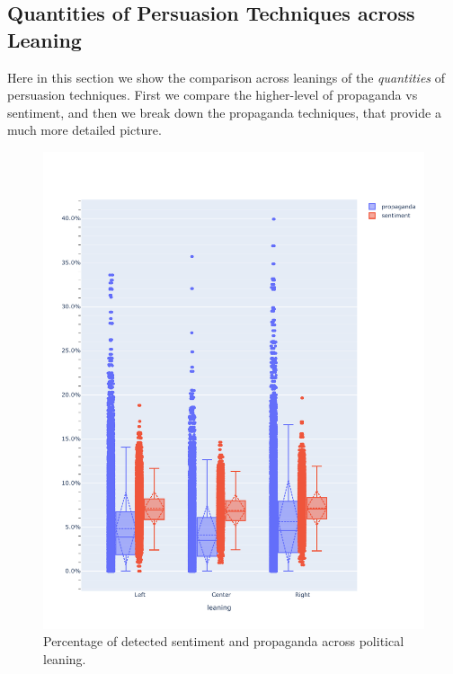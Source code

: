 \subsection{Quantities of Persuasion Techniques across Leaning}

Here in this section we show the comparison across leanings of the \emph{quantities} of persuasion techniques.
First we compare the higher-level of propaganda vs sentiment, and then we break down the propaganda techniques, that provide a much more detailed picture. 

\begin{figure}[!htbp]
    \centering
    \includegraphics[width=\linewidth]{figures/prop_sent_tech_across_leaning_headlines_mod.pdf} %
    \caption{Percentage of detected sentiment and propaganda across political leaning.}
    \label{fig:prop_sent_across_leaning}
\end{figure}

